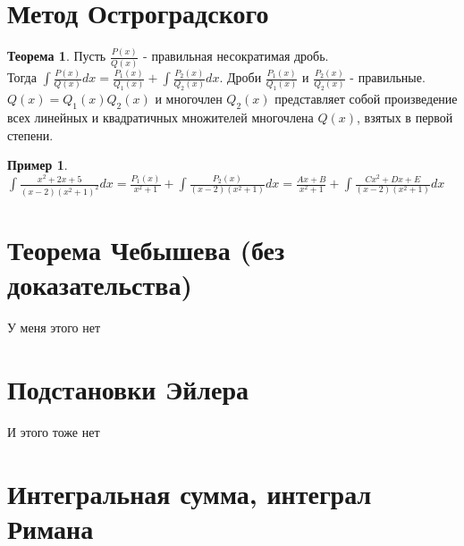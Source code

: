 \documentclass{report}
\theoremstyle{definition}
\newtheorem*{example}{Пример}
\newtheorem*{theorem}{Теорема}
\begin{document}
\section{Метод Остроградского}

\begin{theorem}
    Пусть $\frac{P(x)}{Q(x)}$ - правильная несократимая дробь. \\ Тогда $\int \frac{P(x)}{Q(x)}dx = \frac{P_{1}(x)}{Q_{1}(x)}
        + \int \frac{P_{2}(x)}{Q_{2}(x)}dx$. Дроби $\frac{P_{1}(x)}{Q_{1}(x)}$ и $\frac{P_{2}(x)}{Q_{2}(x)}$ - правильные.
    $Q(x) = Q_{1}(x) Q_{2}(x)$ и многочлен $Q_{2}(x)$ представляет собой произведение всех линейных и квадратичных множителей
    многочлена $Q(x)$, взятых в первой степени.
\end{theorem}

\begin{example}
    $\int \frac{x^{2} + 2x + 5}{(x-2)(x^{2} + 1)^{2}}dx = \frac{P_{1}(x)}{x^{2} + 1} + \int \frac{P_{2}(x)}{(x-2)(x^{2}+1)}dx
        = \frac{Ax + B}{x^{2} + 1} + \int \frac{Cx^{2} + Dx + E}{(x-2)(x^{2}+1)}dx$
\end{example}

\section{Теорема Чебышева (без доказательства)}

У меня этого нет

\section{Подстановки Эйлера}

И этого тоже нет

\section{Интегральная сумма, интеграл Римана}
\end{document}
